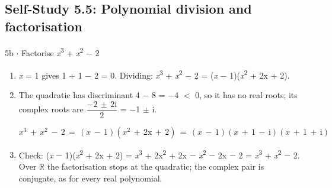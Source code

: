 \documentclass[11pt]{article}
\begin{document}
\begin{keepsection}\subsection{Self-Study 5.5: Polynomial division and factorisation}

\begin{workedbox}{5b \ensuremath{\cdot} Factorise \textit{x}\textsuperscript{3} + \textit{x}\textsuperscript{2} \ensuremath{-} 2}
\begin{enumerate}
\item \textit{x} = 1 gives 1 + 1 \ensuremath{-} 2 = 0. Dividing: \textit{x}\textsuperscript{3} + \textit{x}\textsuperscript{2} \ensuremath{-} 2 = (\textit{x} \ensuremath{-} 1)(\textit{x}\textsuperscript{2} + 2x + 2).
\item {}
The quadratic has discriminant 4 \ensuremath{-} 8 = \ensuremath{-}4 \ensuremath{<} 0, so it has no real roots; its complex roots are {\small\ensuremath{\dfrac{-2\, \pm \, 2\mathrm{i}}{2}}} = \ensuremath{-}1 \ensuremath{\pm} i.

\begin{equation*}{x}^{3}\, +\, {x}^{2}\, -\, 2\, =\, ({x}\, -\, 1)({x}^{2}\, +\, 2\mathrm{x}\, +\, 2)\, =\, ({x}\, -\, 1)({x}\, +\, 1\, -\, \mathrm{i})({x}\, +\, 1\, +\, \mathrm{i})\end{equation*}
\item Check: (\textit{x} \ensuremath{-} 1)(\textit{x}\textsuperscript{2} + 2x + 2) = \textit{x}\textsuperscript{3} + 2x\textsuperscript{2} + 2x \ensuremath{-} \textit{x}\textsuperscript{2} \ensuremath{-} 2x \ensuremath{-} 2 = \textit{x}\textsuperscript{3} + \textit{x}\textsuperscript{2} \ensuremath{-} 2. Over \ensuremath{\mathbb{R}} the factorisation stops at the quadratic; the complex pair is conjugate, as for every real polynomial.
\end{enumerate}
\end{workedbox}

\end{keepsection}
\end{document}
